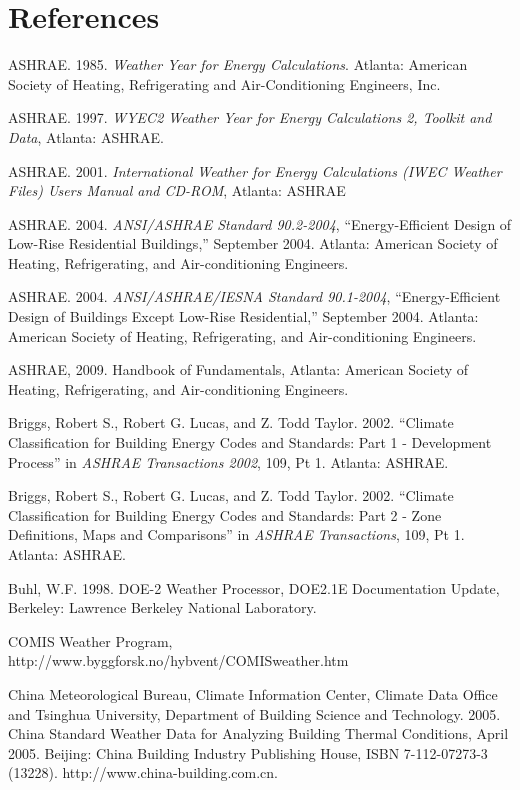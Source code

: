 \section{References}\label{references-002}

ASHRAE. 1985. \emph{Weather Year for Energy Calculations}. Atlanta: American Society of Heating, Refrigerating and Air-Conditioning Engineers, Inc.

ASHRAE. 1997. \emph{WYEC2 Weather Year for Energy Calculations 2, Toolkit and Data}, Atlanta: ASHRAE.

ASHRAE. 2001. \emph{International Weather for Energy Calculations (IWEC Weather Files) Users Manual and CD-ROM}, Atlanta: ASHRAE

ASHRAE. 2004. \emph{ANSI/ASHRAE Standard 90.2-2004}, ``Energy-Efficient Design of Low-Rise Residential Buildings,'' September 2004. Atlanta: American Society of Heating, Refrigerating, and Air-conditioning Engineers.

ASHRAE. 2004. \emph{ANSI/ASHRAE/IESNA Standard 90.1-2004}, ``Energy-Efficient Design of Buildings Except Low-Rise Residential,'' September 2004. Atlanta: American Society of Heating, Refrigerating, and Air-conditioning Engineers.

ASHRAE, 2009. Handbook of Fundamentals, Atlanta: American Society of Heating, Refrigerating, and Air-conditioning Engineers.

Briggs, Robert S., Robert G. Lucas, and Z. Todd Taylor. 2002. ``Climate Classification for Building Energy Codes and Standards: Part 1 - Development Process'' in \emph{ASHRAE Transactions 2002}, 109, Pt 1. Atlanta: ASHRAE.

Briggs, Robert S., Robert G. Lucas, and Z. Todd Taylor. 2002. ``Climate Classification for Building Energy Codes and Standards: Part 2 - Zone Definitions, Maps and Comparisons'' in \emph{ASHRAE Transactions}, 109, Pt 1. Atlanta: ASHRAE.

Buhl, W.F. 1998. DOE-2 Weather Processor, DOE2.1E Documentation Update, Berkeley: Lawrence Berkeley National Laboratory.

COMIS Weather Program, http://www.byggforsk.no/hybvent/COMISweather.htm

China Meteorological Bureau, Climate Information Center, Climate Data Office and Tsinghua University, Department of Building Science and Technology. 2005. China Standard Weather Data for Analyzing Building Thermal Conditions, April 2005. Beijing: China Building Industry Publishing House, ISBN 7-112-07273-3 (13228). http://www.china-building.com.cn.

